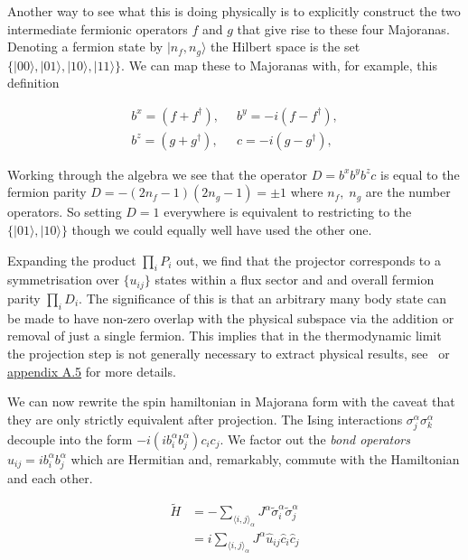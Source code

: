 Another way to see what this is doing physically is to explicitly construct the two intermediate fermionic operators \(f\) and \(g\) that give rise to these four Majoranas. Denoting a fermion state by \(|n_f, n_g\rangle\) the Hilbert space is the set \(\{|00\rangle,|01\rangle,|10\rangle,|11\rangle\}\). We can map these to Majoranas with, for example, this definition

\[\begin{aligned}
b^x = (f + f^\dagger),\;\;& b^y = -i(f - f^\dagger),\\
b^z = (g + g^\dagger),\;\;& c = -i(g - g^\dagger),
\end{aligned}\]

Working through the algebra we see that the operator \(D = b^x b^y b^z c\) is equal to the fermion parity \(D = -(2n_f - 1)(2n_g - 1) = \pm1\) where \(n_f,\; n_g\) are the number operators. So setting \(D = 1\) everywhere is equivalent to restricting to the \(\{|01\rangle,|10\rangle\}\) though we could equally well have used the other one.

Expanding the product \(\prod_i P_i\) out, we find that the projector corresponds to a symmetrisation over \(\{u_{ij}\}\) states within a flux sector and and overall fermion parity \(\prod_i D_i\). The significance of this is that an arbitrary many body state can be made to have non-zero overlap with the physical subspace via the addition or removal of just a single fermion. This implies that in the thermodynamic limit the projection step is not generally necessary to extract physical results, see~\autocite{pedrocchiPhysicalSolutionsKitaev2011} or \protect\hyperlink{app-the-projector}{appendix A.5} for more details.

We can now rewrite the spin hamiltonian in Majorana form with the caveat that they are only strictly equivalent after projection. The Ising interactions \(\sigma_j^{\alpha}\sigma_k^{\alpha}\) decouple into the form \(-i (i b^\alpha_i b^\alpha_j) c_i c_j\). We factor out the \emph{bond operators} \(\hat{u}_{ij} = i b^\alpha_i b^\alpha_j\) which are Hermitian and, remarkably, commute with the Hamiltonian and each other.

\[\begin{aligned}
\tilde{H} &=  - \sum_{\langle i,j\rangle_\alpha} J^{\alpha}\tilde{\sigma}_i^{\alpha}\tilde{\sigma}_j^{\alpha}\\
          &=  i \sum_{\langle i,j\rangle_\alpha} J^{\alpha} \hat{u}_{ij} \hat{c}_i \hat{c}_j
\end{aligned}\]

